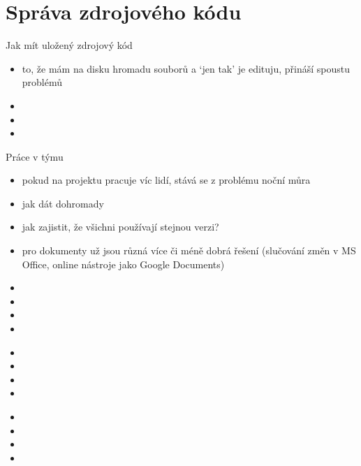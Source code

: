 \documentclass{beamer}
\begin{document}
\section{Správa zdrojového kódu}

\begin{frame}{Jak mít uložený zdrojový kód}
  \begin{itemize}
    \item to, že mám na disku hromadu souborů a `jen tak' je edituju, přináší spoustu problémů
    \item
    \item
    \item
  \end{itemize}
\end{frame}

\begin{frame}{Práce v týmu}
  \begin{itemize}
    \item pokud na projektu pracuje víc lidí, stává se z problému noční můra
    \item jak dát dohromady
    \item jak zajistit, že všichni používají stejnou verzi?
    \item pro dokumenty už jsou různá více či méně dobrá řešení (slučování změn v MS Office, online nástroje jako Google Documents)
  \end{itemize}
\end{frame}

\begin{frame}{}
  \begin{itemize}
    \item
    \item
    \item
    \item
  \end{itemize}
\end{frame}

\begin{frame}{}
  \begin{itemize}
    \item
    \item
    \item
    \item
  \end{itemize}
\end{frame}

\begin{frame}{}
  \begin{itemize}
    \item
    \item
    \item
    \item
  \end{itemize}
\end{frame}
\end{document}
